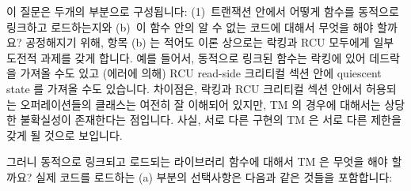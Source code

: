 이 질문은 두개의 부분으로 구성됩니다: (1)~트랜잭션 안에서 어떻게 함수를
동적으로 링크하고 로드하는지와 (b)~이 함수 안의 알 수 없는 코드에 대해서 무엇을
해야 할까요?
공정해지기 위해, 항목 (b) 는 적어도 이론 상으로는 락킹과 RCU 모두에게 일부
도전적 과제를 갖게 합니다.
예를 들어서, 동적으로 링크된 함수는 락킹에 있어 데드락을 가져올 수도 있고
(에러에 의해) RCU read-side 크리티컬 섹션 안에 quiescent state 를 가져올 수도
있습니다.
차이점은, 락킹과 RCU 크리티컬 섹션 안에서 허용되는 오퍼레이션들의 클래스는
여전히 잘 이해되어 있지만, TM 의 경우에 대해서는 상당한 불확실성이 존재한다는
점입니다.
사실, 서로 다른 구현의 TM 은 서로 다른 제한을 갖게 될 것으로 보입니다.

그러니 동적으로 링크되고 로드되는 라이브러리 함수에 대해서 TM 은 무엇을 해야
할까요?
실제 코드를 로드하는 (a) 부분의 선택사항은 다음과 같은 것들을 포함합니다:


